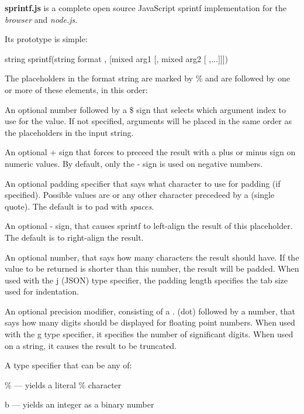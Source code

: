 {\bfseries sprintf.\+js} is a complete open source Java\+Script sprintf implementation for the {\itshape browser} and {\itshape node.\+js}.

Its prototype is simple\+: \begin{DoxyVerb}string sprintf(string format , [mixed arg1 [, mixed arg2 [ ,...]]])
\end{DoxyVerb}


The placeholders in the format string are marked by {\ttfamily \%} and are followed by one or more of these elements, in this order\+:


\begin{DoxyItemize}
\item An optional number followed by a {\ttfamily \$} sign that selects which argument index to use for the value. If not specified, arguments will be placed in the same order as the placeholders in the input string.
\item An optional {\ttfamily +} sign that forces to preceed the result with a plus or minus sign on numeric values. By default, only the {\ttfamily -\/} sign is used on negative numbers.
\item An optional padding specifier that says what character to use for padding (if specified). Possible values are {} or any other character precedeed by a {\ttfamily \textquotesingle{}} (single quote). The default is to pad with {\itshape spaces}.
\item An optional {\ttfamily -\/} sign, that causes sprintf to left-\/align the result of this placeholder. The default is to right-\/align the result.
\item An optional number, that says how many characters the result should have. If the value to be returned is shorter than this number, the result will be padded. When used with the {\ttfamily j} (J\+S\+O\+N) type specifier, the padding length specifies the tab size used for indentation.
\item An optional precision modifier, consisting of a {\ttfamily .} (dot) followed by a number, that says how many digits should be displayed for floating point numbers. When used with the {\ttfamily g} type specifier, it specifies the number of significant digits. When used on a string, it causes the result to be truncated.
\item A type specifier that can be any of\+:
\begin{DoxyItemize}
\item {\ttfamily \%} — yields a literal {\ttfamily \%} character
\item {\ttfamily b} — yields an integer as a binary number

\end{DoxyItemize}
\end{DoxyItemize}
